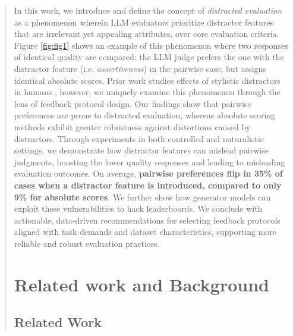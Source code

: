 \documentclass{article}
\begin{document}
\begin{abstract}
In this work, we introduce and define the concept of \emph{distracted evaluation} as a phenomenon wherein LLM evaluators prioritize distractor features that are irrelevant yet appealing attributes, over core evaluation criteria. Figure \ref{fig:fig1} shows an example of this phenomenon where two responses of identical quality are compared: the LLM judge prefers the one with the distractor feature (i.e. \textit{assertiveness}) in the pairwise case, but assigns identical absolute scores. Prior work studies effects of stylistic distractors in humans \citep{hosking2024humanfeedbackgoldstandard}, however, we uniquely examine this phenomenon through the lens of feedback protocol design. Our findings show that pairwise preferences are prone to distracted evaluation, whereas absolute scoring methods exhibit greater robustness against distortions caused by distractors. Through experiments in both controlled and naturalistic settings, we demonstrate how distractor features can mislead pairwise judgments, boosting the lower quality responses and leading to misleading evaluation outcomes. On average, \textbf{pairwise preferences flip in 35\% of cases when a distractor feature is introduced, compared to only 9\% for absolute scores}. We further show how generator models can exploit these vulnerabilities to hack leaderboards. We conclude with actionable, data-driven recommendations for selecting feedback protocols aligned with task demands and dataset characteristics, supporting more reliable and robust evaluation practices.

\section{Related work and Background}

\subsection{Related Work}


\end{abstract}
\end{document}
